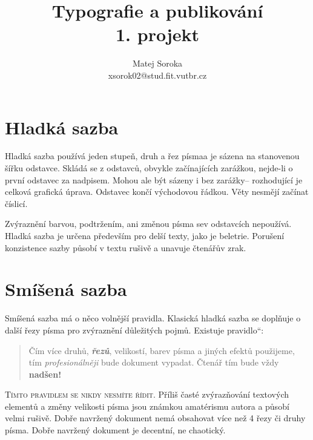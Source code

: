 \documentclass[a4paper,10pt,twocolumn]{article}
\newcommand{\mv}[1]{\quotedblbase#1\textquotedblleft}
\begin{document}
\title{Typografie a publikování\\{\large 1. projekt}}
\author{Matej Soroka\\xsorok02@stud.fit.vutbr.cz}
\date{}

\maketitle

\section{Hladká sazba}
\label{sec:smooth}

Hladká sazba používá jeden stupeň, druh a řez písma\linebreak a je sázena na stanovenou šířku odstavce. Skládá se z odstavců, obvykle začínajících zarážkou, nejde-li o první odstavec za nadpisem. Mohou ale být sázeny i bez zarážky-- rozhodující je celková grafická úprava. Odstavec končí východovou řádkou. Věty nesmějí začínat číslicí.

Zvýraznění barvou, podtržením, ani změnou písma se\linebreak v odstavcích nepoužívá. Hladká sazba je určena především pro delší texty, jako je beletrie. Porušení konzistence sazby působí v textu rušivě a unavuje čtenářův zrak.

\section{Smíšená sazba}\label{2}
\label{sec:mixed}

Smíšená sazba má o něco volnější pravidla. Klasická hladká sazba se doplňuje o další řezy písma pro zvýraznění důležitých pojmů. Existuje \mv{pravidlo}:

\begin{quotation}

    Čím více {\ttfamily druhů}, {\bfseries{\itshape řezů}}, velikostí, barev písma a {\textsf jiných efektů} použijeme, tím \emph{profesionálněji} bude dokument vypadat. Čtenář tím {\tiny bude} vždy {\bfseries{\huge nadšen!}}

\end{quotation}

{\scshape Tímto pravidlem se nikdy nesmíte řídit}. Příliš časté zvýrazňování textových elementů a změny velikosti písma jsou známkou amatérismu autora a působí velmi rušivě. Dobře navržený dokument nemá obsahovat více než
4 řezy či druhy písma. Dobře navržený dokument je decentní, ne chaotický.
\end{document}
